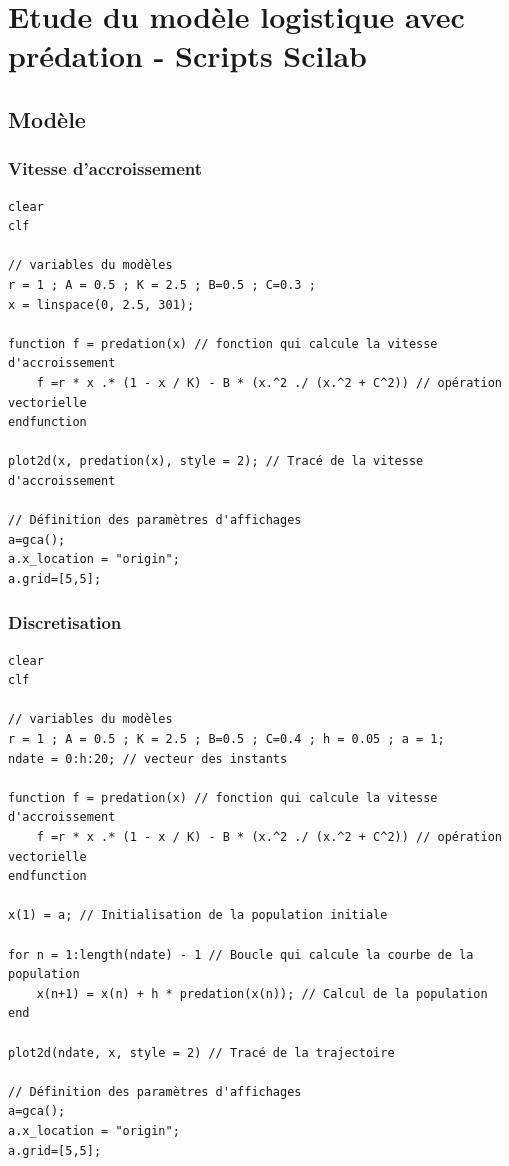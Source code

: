 \documentclass{article}
\begin{document}
\section{Etude du modèle logistique avec prédation - Scripts Scilab}

\subsection{Modèle}

\subsubsection{Vitesse d'accroissement}

\begin{verbatim}
clear
clf

// variables du modèles
r = 1 ; A = 0.5 ; K = 2.5 ; B=0.5 ; C=0.3 ;
x = linspace(0, 2.5, 301);

function f = predation(x) // fonction qui calcule la vitesse d'accroissement
    f =r * x .* (1 - x / K) - B * (x.^2 ./ (x.^2 + C^2)) // opération vectorielle
endfunction

plot2d(x, predation(x), style = 2); // Tracé de la vitesse d'accroissement

// Définition des paramètres d'affichages
a=gca();
a.x_location = "origin";
a.grid=[5,5];
\end{verbatim}

\subsubsection{Discretisation}

\begin{verbatim}
clear
clf

// variables du modèles
r = 1 ; A = 0.5 ; K = 2.5 ; B=0.5 ; C=0.4 ; h = 0.05 ; a = 1;
ndate = 0:h:20; // vecteur des instants

function f = predation(x) // fonction qui calcule la vitesse d'accroissement
    f =r * x .* (1 - x / K) - B * (x.^2 ./ (x.^2 + C^2)) // opération vectorielle
endfunction

x(1) = a; // Initialisation de la population initiale

for n = 1:length(ndate) - 1 // Boucle qui calcule la courbe de la population
    x(n+1) = x(n) + h * predation(x(n)); // Calcul de la population
end

plot2d(ndate, x, style = 2) // Tracé de la trajectoire

// Définition des paramètres d'affichages
a=gca();
a.x_location = "origin";
a.grid=[5,5];
\end{verbatim}
\end{document}
